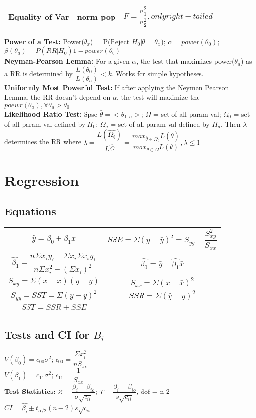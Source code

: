 \documentclass{article}
\begin{document}
\begin{multicols}{2}
\begin{tabular}{|c|c|c|}
Equality of Var & norm pop & $F = \dfrac{\sigma_1^2}{\sigma_2^2}, only right-tailed$ \\ \hline
\end{tabular}
\textbf{Power of a Test:} Power($\theta_x$) = P(Reject $H_0|\theta=\theta_x$); $\alpha = power(\theta_0)$; $\beta(\theta_a) = P(\bar{RR}|\bar{H_0})1-power(\theta_0)$\\
\textbf{Neyman-Pearson Lemma:} For a given $\alpha$, the test that maximizes power($\theta_a$) as a RR is determined by $\dfrac{L(\theta_0)}{L(\theta_a)}<k.$ Works for simple hypotheses.\\
\textbf{Uniformly Most Powerful Test:} If after applying the Neyman Pearson Lemma, the RR doesn't depend on $\alpha$, the test will maximize the $poewr(\theta_a), \forall\theta_a>\theta_0$\\
\textbf{Likelihood Ratio Test:} Spse $\bar{\theta} = <\theta_{1:n}>$; $\Omega$ = set of all param val; $\Omega_0$ = set of all param val defined by $H_0$; $\Omega_a$ = set of all param val defined by $H_a$. Then $\lambda$ determines the RR where $\lambda = \dfrac{L(\hat{\Omega_0})}{L\hat{\Omega}} = \dfrac{max_{\bar{\theta}\in\Omega_0}L(\bar{\theta})}{max_{\theta\in\Omega}L(\theta)}, \lambda \leq 1$\\

\section{Regression}
\subsection{Equations}
\begin{tabular}{c c}
$\hat{y} = \beta_0 + \beta_1 x$ & $SSE = \Sigma (y - \bar{y})^2 = S_{yy} - \dfrac{S_{xy}^2}{S_{xx}}$\\
$\hat{\beta_1} = \dfrac{n\Sigma x_iy_i - \Sigma x_i \Sigma x_iy_i}{n\Sigma x_i^2 - (\Sigma x_i)^2}$ &
$\hat{\beta_0} = \bar{y}-\hat{\beta_1}\bar{x}$\\
$S_{xy} = \Sigma (x-\bar{x})(y-\bar{y})$ &
$S_{xx} = \Sigma (x-\bar{x})^2$\\
$S_{yy} = SST = \Sigma (y-\bar{y})^2$ &
$SSR = \Sigma (\hat{y} - \bar{y})^2$\\
$SST = SSR + SSE$\\
\end{tabular}

\subsection{Tests and CI for $B_i$}
$V(\beta_0) = c_{00}\sigma^2$; $c_{00} = \dfrac{\Sigma x_i^2}{nS_{xx}}$\\
$V(\beta_1) = c_{11}\sigma^2$; $c_{11} = \dfrac{1}{S_{xx}}$\\
\textbf{Test Statistics:} $Z = \dfrac{\beta_i-\beta_{io}}{\sigma\sqrt{c_{ii}}}$; $T = \dfrac{\beta_i-\beta_{io}}{s\sqrt{c_{ii}}}$, dof = n-2\\
$CI = \hat{\beta_i} \pm t_{\alpha/2}(n-2)s\sqrt{c_{ii}}$\\


\end{multicols}
\end{document}

